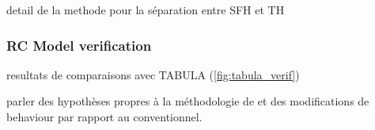 \documentclass[11pt]{article}
\begin{document}
        detail de la methode pour la séparation entre SFH et TH

        





        \subsubsection{RC Model verification} %
        \label{ssub:model_verification}
        
        resultats de comparaisons avec TABULA (\ref{fig:tabula_verif})

        parler des hypothèses propres à la méthodologie de \textcite{pouget_consultants_batiments_2015} et des modifications de behaviour par rapport au conventionnel. 
\end{document}
